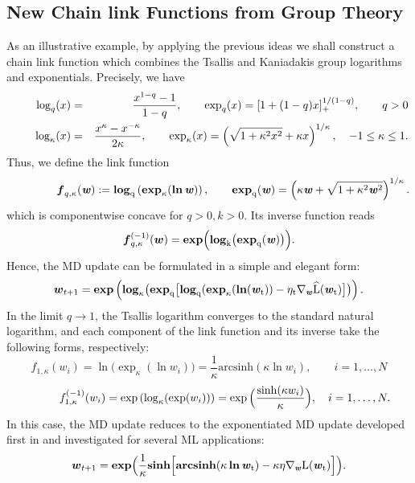 \documentclass[10pt]{amsart}
\newcommand{\beq}{\begin{equation}}
\newcommand{\eeq}{\end{equation}}
\newcommand{\nn}{\nonumber}
\newcommand{\bi}[1]{\textbf{\textit{#1}}}
\newcommand{\bln}{\rm{\bf{ln}}}
\newcommand{\bexp}{\rm{\bf{exp}}}
\newcommand{\blog}{\rm{\bf{log}}}
\newcommand{\bof}{\boldsymbol{f}}
\newcommand{\tcb}{\textcolor{blue}}
\newcommand{\bw}{\boldsymbol{w}}
\theoremstyle{definition}
\theoremstyle{definition}	 %
\begin{document}
\subsection{New Chain link Functions from Group Theory }
As an illustrative example, by applying the previous ideas we shall construct a chain link function which combines the Tsallis and Kaniadakis group logarithms and exponentials. Precisely, we have
\begin{eqnarray*}
\hspace{8mm} \log_q(x)&=&\frac{x^{1-q}-1}{1-q}, \qquad \exp_q(x)= [1+(1-q) x]_+^{1/(1-q)}, \qquad q>0 \\  \hspace{8mm}
\log_{\kappa}(x)&=& \frac{x^{\kappa}- x^{-\kappa}}{2 \kappa}, \qquad  \exp_{\kappa}(x)= \left(\sqrt{1+\kappa^2 x^2} + \kappa x\right)^{1/\kappa}, \quad -1\leq \kappa \leq 1.
\end{eqnarray*}
Thus, we define the  link function %
\beq \label{lnexpk}
\hspace{15mm} \bof_{q,\kappa}(\bi w) := \blog_{q} \left(\bexp_{\kappa}(\bln\,\bi w)\right), \qquad
\bexp_q(\bi w) =  \left(\kappa \bi w + \sqrt{1+\kappa^2 \bi w^2} \right)^{{1}/{\kappa}}.
\eeq
which is componentwise concave for $q>0, k>0$. Its inverse function reads
\beq \nn
\displaystyle  \bof^{(-1)}_{q,\kappa}(\bw) = \bexp\Big(\blog_{k} \big(\bexp_{q}(\bi w)\big)\Big).
\eeq
Hence, the MD update can be formulated in a  simple and elegant form:
\beq
\bw_{t+1} = \bexp \left(\blog_{\kappa} \big(\bexp_{q}\big[\blog_{q} (\bexp_{\kappa}(\bln(\bi w_t))-  \eta_t \nabla_{\bi w} \widehat{L}(\bi w_t)\big]\big)\right).
\eeq
%
In the limit $q\to1$, the Tsallis logarithm converges to the standard natural logarithm, and each component of the link function and its inverse take the following forms, respectively:
\beq \nn
\displaystyle f_{1,\kappa} (w_i) =\ln \big(\exp_{\kappa} (\ln w_i) \big) =
\frac{1}{\kappa}\text{arcsinh} (\kappa \ln w_i ), \qquad i=1,\ldots,N
\eeq
\beq \nn
\hspace{10mm} f_{1,\kappa}^{(-1)} (w_i)=\exp \left(\log_{\kappa} (\exp (w_i))\right) = \exp\Big(\frac{\sinh(\kappa w_i)}{\kappa}\Big), \quad i=1,\ldots,N.
\eeq
In this case, the MD update reduces to the exponentiated MD update developed first in \cite{EGSD} and investigated   for several ML applications:
\beq
\displaystyle \bw_{t+1}  = \bexp\Big(\frac{1}{\kappa}\textbf{sinh} \Big[ \textbf{arcsinh} (\kappa \,\bln \,\bi w_t)  -\kappa \eta \nabla_{\bi w} L(\bi w_t) \Big]\Big)
.
\eeq
\end{document}
